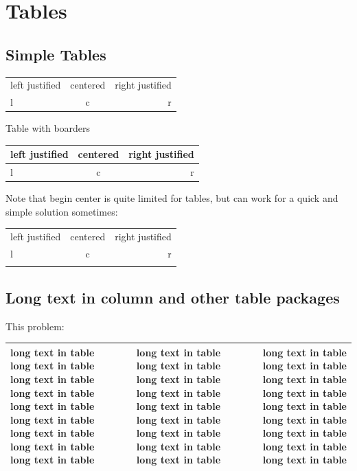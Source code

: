 \documentclass[12pt]{article}
\begin{document}
\section{Tables}

\subsection{Simple Tables}

\begin{tabular}{lcr}
    left justified & centered & right justified \\
    l & c & r
\end{tabular}

\noindent Table with boarders \\

\noindent
\begin{tabular}{ | l |c r| }
    \hline
    left justified & centered & right justified \\
    \hline
    l & c & r \\
    \hline
\end{tabular}

\noindent Note that begin center is quite limited for tables, but can work for a quick and simple solution sometimes: \\
\begin{center}
    \begin{tabular}{ | l |c r| }
        \hhline{ | - | - | - | }
        left justified & centered & right justified \\
        \hhline{ | - | ~ - | }
        l & c & r \\
        \hhline{ | - | ~ - | }
    \end{tabular}
\end{center}

\subsection{Long text in column and other table packages}

This problem: \\
\begin{tabular}{ | l | c | r | }
    \hline
    long text in table long text in table long text in table long text in table long text in table long text in table long text in table long text in table long text in table &
    long text in table long text in table long text in table long text in table long text in table long text in table long text in table long text in table long text in table &
    long text in table long text in table long text in table long text in table long text in table long text in table long text in table long text in table long text in table
    \\
    \hline
\end{tabular}
\end{document}
